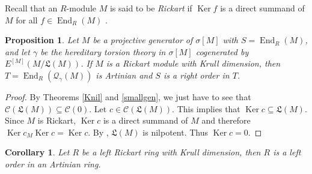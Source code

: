 \documentclass{amsart}
\newtheorem{prop}[thm]{Proposition}
\newtheorem{cor}[thm]{Corollary}
\theoremstyle{definition}
\theoremstyle{remark}
\numberwithin{equation}{section}
\DeclareMathOperator{\Ker}{Ker}
\DeclareMathOperator{\End}{End}
\newcommand{\sm}{\sigma[M]}
\begin{document}
Recall that an $R$-module $M$ is said to be \emph{Rickart} if $\Ker f$ is a direct summand of $M$ for all $f\in\End_R(M)$ \cite{leerickart}. 

\begin{prop}\label{ricgold}
	Let $M$ be a projective generator of $\sm$ with $S=\End_R(M)$, 
	and let $\gamma$ be the hereditary torsion theory in $\sm$ 
	cogenerated by $E^{[M]}(M/\mathfrak{L}(M))$. 
	If $M$ is a Rickart module with Krull dimension, then $T=\End_R(\mathcal{Q}_\gamma(M))$ is Artinian and $S$ is a right order in $T$.
\end{prop}

	\begin{proof}
		By Theorems \ref{Knil} and \ref{smallgen}, we just have to see that $\mathcal{C}(\mathfrak{L}(M))\subseteq\mathcal{C}(0)$. Let $c\in\mathcal{C}(\mathfrak{L}(M))$. This implies that $\Ker c\subseteq\mathfrak{L}(M)$. Since $M$ is Rickart, $\Ker c$ is a direct summand of $M$ and therefore ${\Ker c}_M\Ker c=\Ker c$. By \cite[Corollary 5.5]{mauprimerad}, $\mathfrak{L}(M)$ is nilpotent. Thus $\Ker c=0$. 
	\end{proof}

\begin{cor}
	Let $R$ be a left Rickart ring with Krull dimension, then $R$ is a left order in an Artinian ring.
\end{cor}





\end{document}
